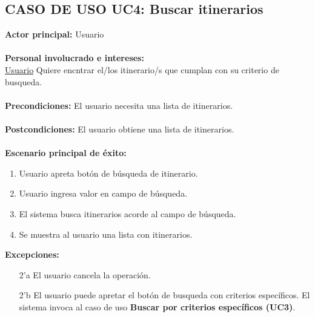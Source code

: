 \documentclass[12pt]{article}
\begin{document}
\subsection{\textbf{CASO DE USO UC4:} Buscar itinerarios }
\textbf{Actor principal:} Usuario\\
\\
\textbf{Personal involucrado e intereses: }\\\underline{Usuario} Quiere encntrar el/los itinerario/s que cumplan con su criterio de busqueda.\\
\\
\textbf{Precondiciones:} El usuario necesita una lista de itinerarios.\\
\\
\textbf{Postcondiciones:} El usuario obtiene una lista de itinerarios.\\
\\
\textbf{Escenario principal de éxito:}
\begin{enumerate}
\item Usuario apreta botón de búsqueda de itinerario.
\item Usuario ingresa valor en campo de búsqueda.
\item El sistema busca itinerarios acorde al campo de búsqueda.
\item Se muestra al usuario una lista con itinerarios.
\end{enumerate}
\textbf{Excepciones:}
\begin{enumerate}
\item[2'a] El usuario cancela la operación.
\item[2'b] El usuario puede apretar el botón de busqueda con criterios específicos. El sistema invoca al caso de uso \textbf{Buscar por criterios específicos (UC3)}.
\end{enumerate}
\newpage
\end{document}

